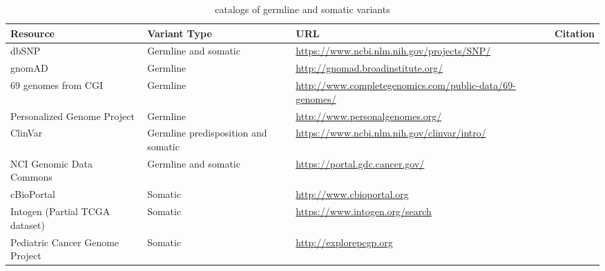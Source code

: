 \documentclass{article}
\begin{document}
\begin{table}[p]
\centering
\begin{tabularx}{\textwidth}{p{3.5cm}p{2cm}Xp{3cm}}
  \hline
Resource & Variant Type & URL & Citation \\
  \hline
  dbSNP & Germline and somatic & \url{https://www.ncbi.nlm.nih.gov/projects/SNP/} & \parencite{Sherry2001-li} \\
  gnomAD  & Germline & \url{http://gnomad.broadinstitute.org/} & \parencite{Lek2016-bb} \\
  69 genomes from CGI & Germline & \url{http://www.completegenomics.com/public-data/69-genomes/} & \parencite{Drmanac2010-od} \\
  Personalized Genome Project & Germline & \url{http://www.personalgenomes.org/} & \parencite{Church2005-lr} \\
  ClinVar & Germline predisposition and somatic & \url{https://www.ncbi.nlm.nih.gov/clinvar/intro/} & \parencite{Landrum2016-ul} \\
  NCI Genomic Data Commons & Germline and somatic & \url{https://portal.gdc.cancer.gov/} & \parencite{Grossman2016-sk} \\
  cBioPortal & Somatic & \url{http://www.cbioportal.org} & \parencite{Cerami2012-el,Gao2013-li} \\
  Intogen (Partial TCGA dataset) & Somatic & \url{https://www.intogen.org/search} & \parencite{Rubio-Perez2015-ek,Gonzalez-Perez2013-cl} \\
  Pediatric Cancer Genome Project  & Somatic & \url{http://explorepcgp.org} & \parencite{Downing2012-do} \\
   \hline
\end{tabularx}
\caption{catalogs of germline and somatic variants}
\label{table:1}
\end{table}
\end{document}
